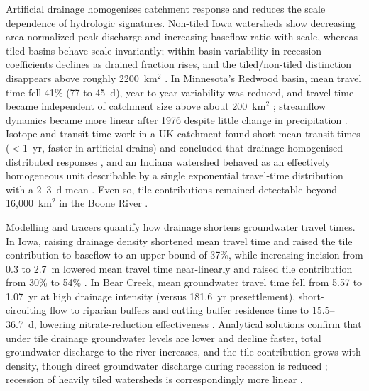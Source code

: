 \documentclass[11pt]{article}
\begin{document}
Artificial drainage homogenises catchment response and reduces the scale dependence of hydrologic signatures. Non-tiled Iowa watersheds show decreasing area-normalized peak discharge and increasing baseflow ratio with scale, whereas tiled basins behave scale-invariantly; within-basin variability in recession coefficients declines as drained fraction rises, and the tiled/non-tiled distinction disappears above roughly 2200~km$^2$ \parencite{BolandBrien2014}. In Minnesota's Redwood basin, mean travel time fell 41\% (77 to 45~d), year-to-year variability was reduced, and travel time became independent of catchment size above about 200~km$^2$ \parencite{DaneshYazdi2016}; streamflow dynamics became more linear after 1976 despite little change in precipitation \parencite{FoufoulaGeorgiou2015}. Isotope and transit-time work in a UK catchment found short mean transit times ($<$1~yr, faster in artificial drains) and concluded that drainage homogenised distributed responses \parencite{DimitrovaPetrova2020}, and an Indiana watershed behaved as an effectively homogeneous unit describable by a single exponential travel-time distribution with a 2--3~d mean \parencite{Basu2010}. Even so, tile contributions remained detectable beyond 16{,}000~km$^2$ in the Boone River \parencite{Schilling2019}.

Modelling and tracers quantify how drainage shortens groundwater travel times. In Iowa, raising drainage density shortened mean travel time and raised the tile contribution to baseflow to an upper bound of 37\%, while increasing incision from 0.3 to 2.7~m lowered mean travel time near-linearly and raised tile contribution from 30\% to 54\% \parencite{Schilling2012}. In Bear Creek, mean groundwater travel time fell from 5.57 to 1.07~yr at high drainage intensity (versus 181.6~yr presettlement), short-circuiting flow to riparian buffers and cutting buffer residence time to 15.5--36.7~d, lowering nitrate-reduction effectiveness \parencite{Schilling2015}. Analytical solutions confirm that under tile drainage groundwater levels are lower and decline faster, total groundwater discharge to the river increases, and the tile contribution grows with density, though direct groundwater discharge during recession is reduced \parencite{Liang2015}; recession of heavily tiled watersheds is correspondingly more linear \parencite{Schilling2008}.
\end{document}
